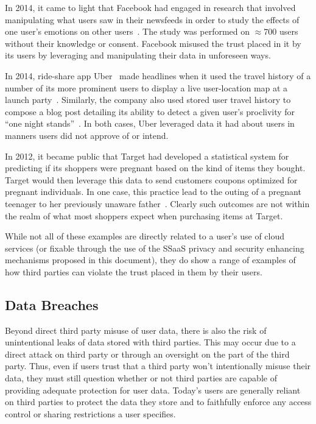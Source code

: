 \begin{packed_desc}
\item[Facebook Emotional Contagion Study:] In 2014, it came to light
  that Facebook had engaged in research that involved manipulating
  what users saw in their newsfeeds in order to study the effects of
  one user's emotions on other users~\cite{goel2014}. The study was
  performed on $\approx700$ users without their knowledge or
  consent. Facebook misused the trust placed in it by its users by
  leveraging and manipulating their data in unforeseen ways.
\item[Uber User Travel History:] In 2014, ride-share app
  Uber~\cite{uber} made headlines when it used the travel history of a
  number of its more prominent users to display a live user-location
  map at a launch party~\cite{sims2014}. Similarly, the company also
  used stored user travel history to compose a blog post detailing its
  ability to detect a given user's proclivity for ``one night
  stands''~\cite{pagliery2014}. In both cases, Uber leveraged data it
  had about users in manners users did not approve of or intend.
\item[Target Pregnancy Prediction:] In 2012, it became public that
  Target had developed a statistical system for predicting if its
  shoppers were pregnant based on the kind of items they
  bought. Target would then leverage this data to send customers
  coupons optimized for pregnant individuals. In one case, this
  practice lead to the outing of a pregnant teenager to her previously
  unaware father~\cite{hill2012}. Clearly such outcomes are not within
  the realm of what most shoppers expect when purchasing items at
  Target.
\end{packed_desc}

While not all of these examples are directly related to a user's use
of cloud services (or fixable through the use of the SSaaS privacy and
security enhancing mechanisms proposed in this document), they do show
a range of examples of how third parties can violate the trust placed
in them by their users.

\subsection{Data Breaches}

Beyond direct third party misuse of user data, there is also the risk
of unintentional leaks of data stored with third parties. This may
occur due to a direct attack on third party or through an oversight on
the part of the third party. Thus, even if users trust that a third
party won't intentionally misuse their data, they must still question
whether or not third parties are capable of providing adequate
protection for user data. Today's users are generally reliant on third
parties to protect the data they store and to faithfully enforce any
access control or sharing restrictions a user specifies.

